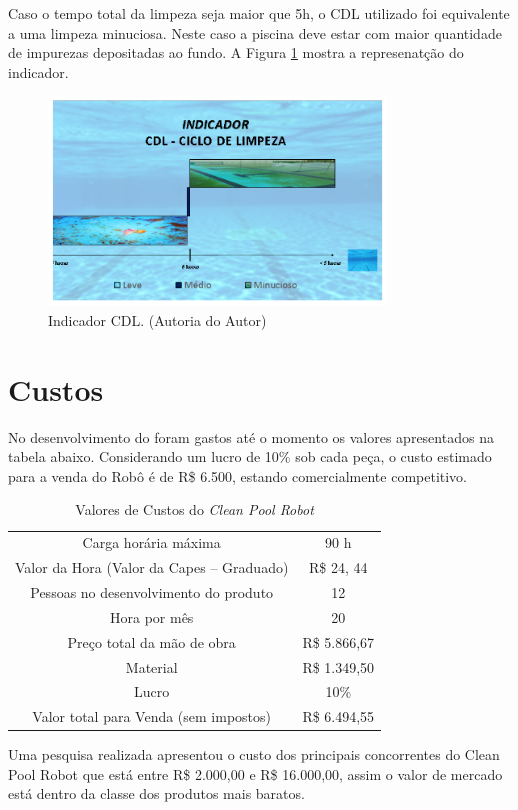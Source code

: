 Caso o tempo total da limpeza seja maior que 5h, o \textsf{CDL} utilizado foi equivalente a uma limpeza minuciosa. Neste caso a piscina deve estar com maior quantidade de impurezas depositadas ao fundo. A Figura \ref{fig:indicator} mostra a represenatção do indicador.
\par
  \begin{figure}[h]
    \centering
    \includegraphics[width=0.8\textwidth]{figures/indicator.png}
    \caption{Indicador CDL. (\textsf{Autoria do Autor})}
    \label{fig:indicator}
  \end{figure}
  \FloatBarrier
\par

\section{Custos}
No desenvolvimento do \cpr foram gastos até o momento os valores apresentados na tabela abaixo. Considerando um lucro de 10\% sob cada peça, o custo estimado para a venda do Robô é de R\$ 6.500, estando comercialmente competitivo.
\begin{table}[h]
\centering
\caption{Valores de Custos do \textit{Clean Pool Robot}}
\label{my-label}
\begin{tabular}{@{}cc@{}}
Carga horária máxima                      & 90 h         \\
Valor da Hora (Valor da Capes – Graduado) & R\$ 24, 44   \\
Pessoas no desenvolvimento do produto     & 12           \\
Hora por mês                              & 20           \\
Preço total da mão de obra                & R\$ 5.866,67 \\
Material                                  & R\$ 1.349,50 \\
Lucro                                     & 10\%         \\ \midrule
Valor total para Venda (sem impostos)     & R\$ 6.494,55
\end{tabular}
\end{table}

Uma pesquisa realizada apresentou o custo dos principais concorrentes do Clean Pool Robot que está entre R\$ 2.000,00 e R\$ 16.000,00, assim o valor de mercado está dentro da classe dos produtos mais baratos.
